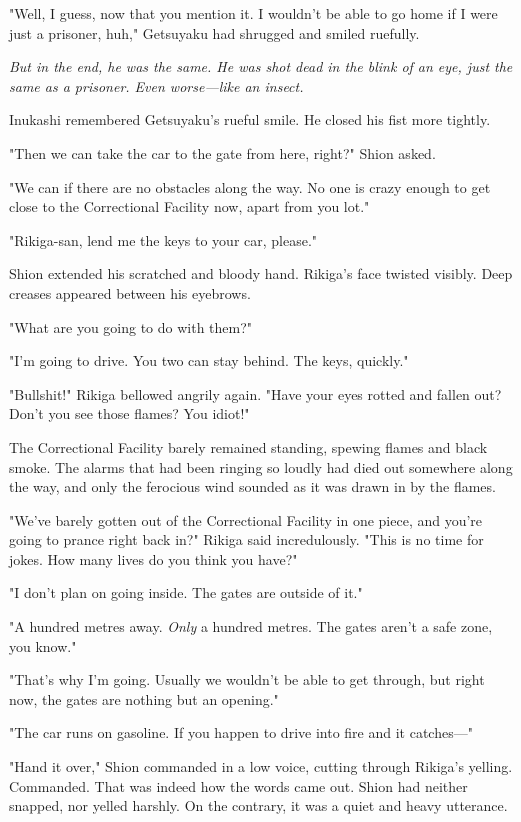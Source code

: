 "Well, I guess, now that you mention it. I wouldn't be able to go home
if I were just a prisoner, huh," Getsuyaku had shrugged and smiled
ruefully.

\emph{But in the end, he was the same. He was shot dead in the blink of an
eye, just the same as a prisoner. Even worse---like an insect.}

Inukashi remembered Getsuyaku's rueful smile. He closed his fist more
tightly.

"Then we can take the car to the gate from here, right?" Shion asked.

"We can if there are no obstacles along the way. No one is crazy enough
to get close to the Correctional Facility now, apart from you lot."

"Rikiga-san, lend me the keys to your car, please."

Shion extended his scratched and bloody hand. Rikiga's face twisted
visibly. Deep creases appeared between his eyebrows.

"What are you going to do with them?"

"I'm going to drive. You two can stay behind. The keys, quickly."

"Bullshit!" Rikiga bellowed angrily again. "Have your eyes rotted and
fallen out? Don't you see those flames? You idiot!"

The Correctional Facility barely remained standing, spewing flames and
black smoke. The alarms that had been ringing so loudly had died out
somewhere along the way, and only the ferocious wind sounded as it was
drawn in by the flames.

"We've barely gotten out of the Correctional Facility in one piece, and
you're going to prance right back in?" Rikiga said incredulously. "This
is no time for jokes. How many lives do you think you have?"

"I don't plan on going inside. The gates are outside of it."

"A hundred metres away. \emph{Only} a hundred metres. The gates aren't a safe
zone, you know."

"That's why I'm going. Usually we wouldn't be able to get through, but
right now, the gates are nothing but an opening."

"The car runs on gasoline. If you happen to drive into fire and it
catches---"

"Hand it over," Shion commanded in a low voice, cutting through Rikiga's
yelling. Commanded. That was indeed how the words came out. Shion had
neither snapped, nor yelled harshly. On the contrary, it was a quiet and
heavy utterance.

